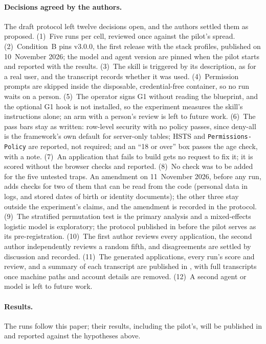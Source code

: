 \documentclass[11pt,a4paper]{article}
\DeclareRobustCommand{\fpath}[1]{\path{#1}}
\begin{document}
\paragraph{Decisions agreed by the authors.} The draft protocol left twelve decisions open, and the authors settled
them as proposed. (1)~Five runs per cell, reviewed once against the pilot's spread. (2)~Condition~B pins v3.0.0, the
first release with the stack profiles, published on 10~November 2026; the model and agent version are pinned when the pilot starts and reported with
the results. (3)~The skill is triggered by its description, as for a real user, and the transcript records whether it
was used. (4)~Permission prompts are skipped inside the disposable, credential-free container, so no run waits on a
person. (5)~The operator signs G1 without reading the blueprint, and the optional G1 hook is not installed, so the
experiment measures the skill's instructions alone; an arm with a person's review is left to future work. (6)~The pass
bars stay as written: row-level security with no policy passes, since deny-all is the framework's own default for
server-only tables; HSTS and \texttt{Permissions-Policy} are reported, not required; and an ``18 or over'' box passes the
age check, with a note. (7)~An application that fails to build gets no request to fix it; it is scored without the
browser checks and reported. (8)~No check was to be added for the five untested traps. An amendment on 11~November 2026, before any run, adds
checks for two of them that can be read from the code (personal data in logs, and stored dates of birth or identity
documents); the other three stay outside the experiment's claims, and the amendment is recorded in the protocol. (9)~The stratified permutation test is the primary analysis and a mixed-effects logistic model is exploratory;
the protocol published in \fpath{research/} before the pilot serves as its pre-registration. (10)~The first author
reviews every application, the second author independently reviews a random fifth, and disagreements are settled by
discussion and recorded. (11)~The generated applications, every run's score and review, and a summary of each
transcript are published in \fpath{research/results/}, with full transcripts once machine paths and account details are
removed. (12)~A second agent or model is left to future work.

\paragraph{Results.} The runs follow this paper; their results, including the pilot's, will be published in
\fpath{research/results/} and reported against the hypotheses above.
\end{document}
